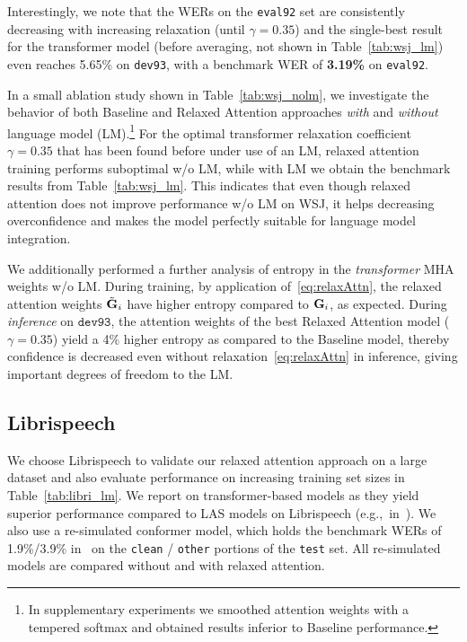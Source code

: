 \documentclass{article}
\begin{document}
Interestingly, we note that the WERs on the \texttt{eval92} set are consistently decreasing with increasing relaxation (until $\gamma\!=\!0.35$) and the single-best result for the transformer model (before averaging, not shown in Table~\ref{tab:wsj_lm}) even reaches 5.65\% on \texttt{dev93}, with a benchmark WER of \textbf{3.19\%} on \texttt{eval92}.

In a small ablation study shown in Table~\ref{tab:wsj_nolm}, we investigate the behavior of both \textsf{Baseline} and \textsf{Relaxed Attention} approaches \textit{with} and \textit{without} language model (LM).\footnote{In supplementary experiments we smoothed attention weights with a tempered softmax and obtained results inferior to \textsf{Baseline} performance.} For the optimal transformer relaxation coefficient $\gamma\!=\!0.35$ that has been found before under use of an LM, relaxed attention training performs suboptimal w/o LM, while with LM we obtain the benchmark results from Table~\ref{tab:wsj_lm}. This indicates that even though relaxed attention does not improve performance w/o LM on WSJ, it helps decreasing overconfidence and makes the model perfectly suitable for language model integration.

We additionally performed a further analysis of entropy in the \textit{transformer} MHA weights w/o LM. During training, by application of~\eqref{eq:relaxAttn}, the relaxed attention weights $\tilde{\mathbf{G}}_i$ have higher entropy compared to $\mathbf{G}_i$, as expected. During \textit{inference} on $\texttt{dev93}$, the attention weights of the best \textsf{Relaxed Attention} model ($\gamma\!=\!0.35$) yield a 4\% higher entropy as compared to the \textsf{Baseline} model, thereby confidence is decreased even without relaxation~\eqref{eq:relaxAttn} in inference, giving important degrees of freedom to the LM. 
  
\vspace{-2mm}
\subsection{Librispeech}\vspace{-2.5mm}
We choose Librispeech to validate our relaxed attention approach on a large dataset and also evaluate performance on increasing training set sizes in Table~\ref{tab:libri_lm}. We report on transformer-based models as they yield superior performance compared to LAS models on Librispeech (e.g.,\ in~\cite{Karita2019,Zeyer2019}). We also use a re-simulated conformer model, which holds the benchmark WERs of 1.9\%/3.9\% in~\cite{Gulati2020} on the \texttt{clean} / \texttt{other} portions of the \texttt{test} set. All re-simulated models are compared without and with relaxed attention.
\end{document}
